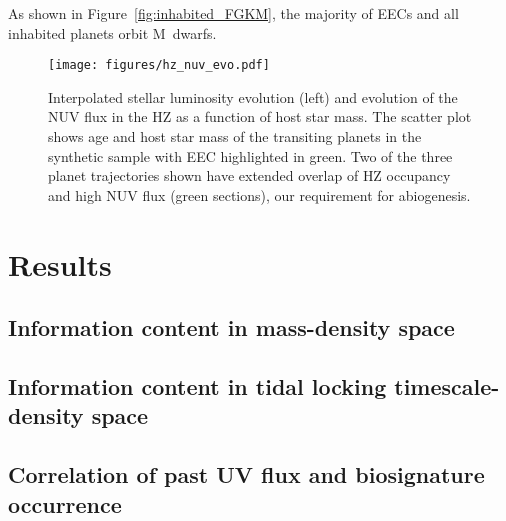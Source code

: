 \documentclass[modern,linenumbers]{aastex631}
\begin{document}
As shown in Figure~\ref{fig:inhabited_FGKM}, the majority of \glspl{EEC} and all inhabited planets orbit M~dwarfs.


\begin{figure*}
    \begin{centering}
        \texttt{[image: figures/hz\_nuv\_evo.pdf]}
        \caption{Interpolated stellar luminosity evolution (left) and evolution of the \gls{NUV} flux in the \gls{HZ} as a function of host star mass. The scatter plot shows age and host star mass of the transiting planets in the synthetic sample with \gls{EEC} highlighted in green.
        Two of the three planet trajectories shown have extended overlap of \gls{HZ} occupancy and high \gls{NUV} flux (green sections), our requirement for abiogenesis.}
        \label{fig:hz_nuv_evo}
    \end{centering}
\end{figure*}











\section{Results}
\label{sec:results}
\subsection{Information content in mass-density space}

\subsection{Information content in tidal locking timescale-density space}

\subsection{Correlation of past UV flux and biosignature occurrence}\label{sec:results_uv}
\end{document}

